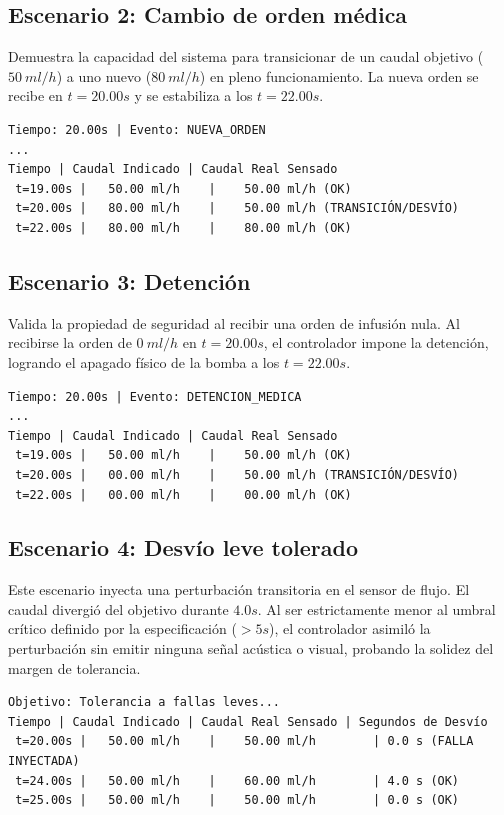 \subsection{Escenario 2: Cambio de orden médica}
Demuestra la capacidad del sistema para transicionar de un caudal objetivo ($50~ml/h$) a uno nuevo ($80~ml/h$) en pleno funcionamiento. La nueva orden se recibe en $t=20.00s$ y se estabiliza a los $t=22.00s$.
\begin{verbatim}
Tiempo: 20.00s | Evento: NUEVA_ORDEN
...
Tiempo | Caudal Indicado | Caudal Real Sensado
 t=19.00s |   50.00 ml/h    |    50.00 ml/h (OK)
 t=20.00s |   80.00 ml/h    |    50.00 ml/h (TRANSICIÓN/DESVÍO)
 t=22.00s |   80.00 ml/h    |    80.00 ml/h (OK)
\end{verbatim}

\subsection{Escenario 3: Detención}
Valida la propiedad de seguridad al recibir una orden de infusión nula. Al recibirse la orden de $0~ml/h$ en $t=20.00s$, el controlador impone la detención, logrando el apagado físico de la bomba a los $t=22.00s$.
\begin{verbatim}
Tiempo: 20.00s | Evento: DETENCION_MEDICA
...
Tiempo | Caudal Indicado | Caudal Real Sensado
 t=19.00s |   50.00 ml/h    |    50.00 ml/h (OK)
 t=20.00s |   00.00 ml/h    |    50.00 ml/h (TRANSICIÓN/DESVÍO)
 t=22.00s |   00.00 ml/h    |    00.00 ml/h (OK)
\end{verbatim}

\subsection{Escenario 4: Desvío leve tolerado}
Este escenario inyecta una perturbación transitoria en el sensor de flujo. El caudal divergió del objetivo durante $4.0s$. Al ser estrictamente menor al umbral crítico definido por la especificación ($>5s$), el controlador asimiló la perturbación sin emitir ninguna señal acústica o visual, probando la solidez del margen de tolerancia.
\begin{verbatim}
Objetivo: Tolerancia a fallas leves...
Tiempo | Caudal Indicado | Caudal Real Sensado | Segundos de Desvío
 t=20.00s |   50.00 ml/h    |    50.00 ml/h        | 0.0 s (FALLA INYECTADA)
 t=24.00s |   50.00 ml/h    |    60.00 ml/h        | 4.0 s (OK)
 t=25.00s |   50.00 ml/h    |    50.00 ml/h        | 0.0 s (OK)
\end{verbatim}

